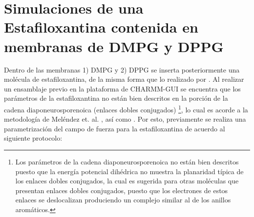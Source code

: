 \section{Simulaciones de una Estafiloxantina contenida en membranas de DMPG y DPPG } \label{sec:1stxpg}
Dentro de las membranas 1) DMPG y 2) DPPG se inserta posteriormente una mol\'{e}cula de estafiloxantina, de la misma forma que lo realizado por \cite{Melendez-Delgado2018StudyingBilayers}. Al realizar un ensamblaje previo en la plataforma de CHARMM-GUI \cite{Brooks2009} se encuentra que los par\'{a}metros de la estafiloxantina no est\'{a}n bien descritos en la porci\'{o}n de la cadena diaponeurosporenoica (enlaces dobles conjugados) \footnote{Los par\'{a}metros de la cadena diaponeurosporenoica no est\'{a}n bien descritos puesto que la energ\'{i}a potencial dih\'{e}drica no muestra la planaridad t\'{i}pica de los enlaces dobles conjugados, la cual es sugerida para otras mol\'{e}culas que presentan enlaces dobles conjugados, puesto que los electrones de estos enlaces se deslocalizan produciendo un complejo similar al de los anillos arom\'{a}ticos.}, lo cual es acorde a la metodolog\'{i}a de Mel\'{e}ndez et. al. \cite{Melendez-Delgado2018StudyingBilayers}, as\'{i} como \cite{Grudzinski2017LocalizationBilayer}. Por esto, previamente se realiza una parametrizaci\'{o}n del campo de fuerza para la estafiloxantina de acuerdo al siguiente protocolo:\\



